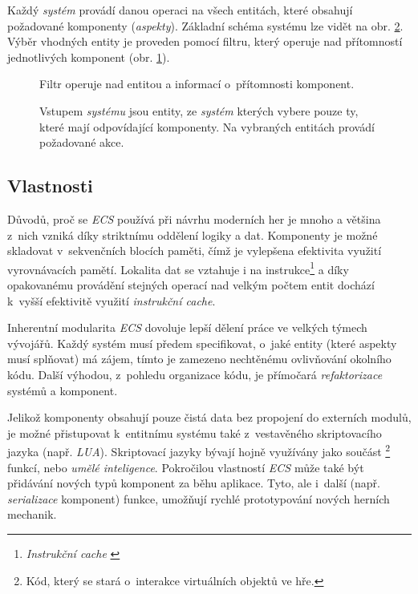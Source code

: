 Každý \emph{systém} provádí danou operaci na všech entitách, které obsahují požadované komponenty (\emph{aspekty}). Základní schéma systému lze vidět na obr. \ref{Fig:ECSSystem}. Výběr vhodných entity je proveden pomocí filtru, který operuje nad přítomností jednotlivých komponent (obr. \ref{Fig:ECSFilter}).

\begin{figure}[H]
	\centering
	\caption{Filtr operuje nad entitou a informací o~přítomnosti komponent.}
	\label{Fig:ECSFilter}
\end{figure}

\begin{figure}[H]
	\centering
	\caption{Vstupem \emph{systému} jsou entity, ze \emph{systém} kterých vybere pouze ty, které mají odpovídající komponenty. Na vybraných entitách provádí požadované akce.}
	\label{Fig:ECSSystem}
\end{figure}

\subsection{Vlastnosti}

Důvodů, proč se \emph{ECS} používá při návrhu moderních her je mnoho a většina z~nich vzniká díky striktnímu oddělení logiky a dat. Komponenty je možné skladovat v~sekvenčních blocích paměti, čímž je vylepšena efektivita využití vyrovnávacích pamětí. Lokalita dat se vztahuje i na instrukce\footnote{\emph{Instrukční cache} \cite{CpuMemoryGap, InstrAreData}} a díky opakovanému provádění stejných operací nad velkým počtem entit dochází k~vyšší efektivitě využití \emph{instrukční cache}. 

Inherentní modularita \emph{ECS} dovoluje lepší dělení práce ve velkých týmech vývojářů. Každý systém musí předem specifikovat, o~jaké entity (které aspekty musí splňovat) má zájem, tímto je zamezeno nechtěnému ovlivňování okolního kódu. Další výhodou, z~pohledu organizace kódu, je přímočará \emph{refaktorizace} systémů a komponent.

Jelikož komponenty obsahují pouze čistá data bez propojení do externích modulů, je možné přistupovat k~entitnímu systému také z~vestavěného skriptovacího jazyka (např. \emph{LUA}). Skriptovací jazyky bývají hojně využívány jako součást \footnote{Kód, který se stará o~interakce virtuálních objektů ve hře.} funkcí, nebo \emph{umělé inteligence}. Pokročilou vlastností \emph{ECS} může také být přidávání nových typů komponent za běhu aplikace. Tyto, ale i~další (např. \emph{serializace} komponent) funkce, umožňují rychlé prototypování nových herních mechanik.

